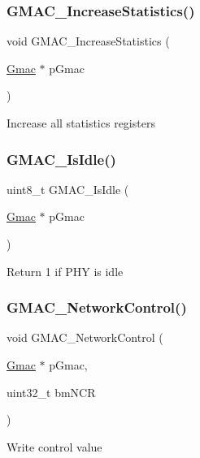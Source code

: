\subsubsection{\texorpdfstring{GMAC\_IncreaseStatistics()}{GMAC\_IncreaseStatistics()}}
{\footnotesize\ttfamily void G\+M\+A\+C\+\_\+\+Increase\+Statistics (\begin{DoxyParamCaption}\item[{\mbox{\hyperlink{structGmac}{Gmac}} $\ast$}]{p\+Gmac }\end{DoxyParamCaption})}

Increase all statistics registers \mbox{\label{group__gmac__defines_gaa08d910a6f3f99c429158ad429368ffc}} 
\subsubsection{\texorpdfstring{GMAC\_IsIdle()}{GMAC\_IsIdle()}}
{\footnotesize\ttfamily uint8\+\_\+t G\+M\+A\+C\+\_\+\+Is\+Idle (\begin{DoxyParamCaption}\item[{\mbox{\hyperlink{structGmac}{Gmac}} $\ast$}]{p\+Gmac }\end{DoxyParamCaption})}

Return 1 if P\+HY is idle \mbox{\label{group__gmac__defines_ga4dfdc785358f1239d80a46dc2108a15c}} 
\subsubsection{\texorpdfstring{GMAC\_NetworkControl()}{GMAC\_NetworkControl()}}
{\footnotesize\ttfamily void G\+M\+A\+C\+\_\+\+Network\+Control (\begin{DoxyParamCaption}\item[{\mbox{\hyperlink{structGmac}{Gmac}} $\ast$}]{p\+Gmac,  }\item[{uint32\+\_\+t}]{bm\+N\+CR }\end{DoxyParamCaption})}

Write control value \mbox{\label{group__gmac__defines_gac8f081caf9548311d6bd54ce1fca606d}} 
